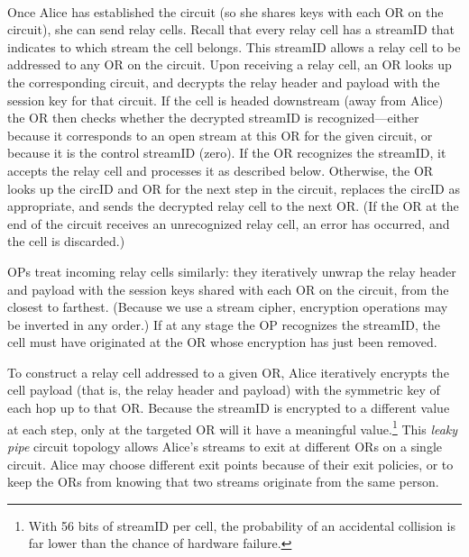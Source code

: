 \documentclass[times,10pt,twocolumn]{article}
\begin{document}
\\
%
Once Alice has established the circuit (so she shares keys with each
OR on the circuit), she can send relay cells.  Recall that every relay
cell has a streamID that indicates to which
stream the cell belongs.  This streamID allows a relay cell to be
addressed to any OR on the circuit.  Upon receiving a relay
cell, an OR looks up the corresponding circuit, and decrypts the relay
header and payload with the session key for that circuit.
If the cell is headed downstream (away from Alice) the OR then checks
whether the decrypted streamID is recognized---either because it
corresponds to an open stream at this OR for the given circuit, or because
it is the control streamID (zero).  If the OR recognizes the
streamID, it accepts the relay cell and processes it as described
below.  Otherwise, 
the OR looks up the circID and OR for the
next step in the circuit, replaces the circID as appropriate, and
sends the decrypted relay cell to the next OR.  (If the OR at the end
of the circuit receives an unrecognized relay cell, an error has
occurred, and the cell is discarded.)

OPs treat incoming relay cells similarly: they iteratively unwrap the
relay header and payload with the session keys shared with each
OR on the circuit, from the closest to farthest.  (Because we use a
stream cipher, encryption operations may be inverted in any order.)
If at any stage the OP recognizes the streamID, the cell must have
originated at the OR whose encryption has just been removed.

To construct a relay cell addressed to a given OR, Alice iteratively
encrypts the cell payload (that is, the relay header and payload) with
the symmetric key of each hop up to that OR.  Because the streamID is
encrypted to a different value at each step, only at the targeted OR
will it have a meaningful value.\footnote{
With 56 bits of streamID per cell, the probability of an accidental
collision is far lower than the chance of hardware failure.}
This \emph{leaky pipe} circuit topology
allows Alice's streams to exit at different ORs on a single circuit.  
Alice may choose different exit points because of their exit policies,
or to keep the ORs from knowing that two streams
originate from the same person.
\end{document}
